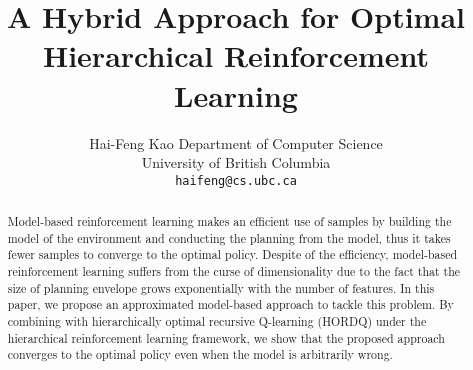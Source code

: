 \documentclass{article} %
\title{A Hybrid Approach for Optimal Hierarchical Reinforcement Learning}
\author{
Hai-Feng Kao
Department of Computer Science\\
University of British Columbia\\
\texttt{haifeng@cs.ubc.ca}
}
\begin{document}
\maketitle

\begin{abstract}
Model-based reinforcement learning makes an efficient use of samples by 
building the model of the environment and conducting the planning from the model,
thus it takes fewer samples to converge to the optimal policy.
Despite of the efficiency, model-based reinforcement learning 
suffers from the curse of dimensionality due to the fact that
the size of planning envelope grows exponentially with the number 
of features. In this paper, we propose an approximated model-based
approach to tackle this problem. By combining with 
hierarchically optimal recursive Q-learning (HORDQ) under 
the hierarchical reinforcement learning framework, we show that
the proposed approach converges to the optimal policy even when
the model is arbitrarily wrong.
\end{abstract}



\end{document}
